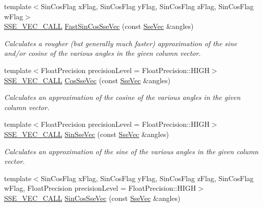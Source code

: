 \begin{DoxyCompactItemize}
{\footnotesize template$<$Sin\+Cos\+Flag x\+Flag, Sin\+Cos\+Flag y\+Flag, Sin\+Cos\+Flag z\+Flag, Sin\+Cos\+Flag w\+Flag$>$ }\\\hyperlink{ssevec__math__defs_8h_a97454f977a5281455cecacce1e8ba670}{S\+S\+E\+\_\+\+V\+E\+C\+\_\+\+C\+A\+L\+L} \hyperlink{group___s_i_m_d_vec_math_gafadb857fe7e6ccbe5f3c635e3c205258}{Fast\+Sin\+Cos\+Sse\+Vec} (const \hyperlink{namespacegofxmath_a634570ddcd2496053ee966227080e02f}{Sse\+Vec} \&angles)
\begin{DoxyCompactList}\small\item\em Calculates a rougher (but generally much faster) approximation of the sine and/or cosine of the various angles in the given column vector. \end{DoxyCompactList}\item 
{\footnotesize template$<$Float\+Precision precision\+Level = Float\+Precision\+::\+H\+I\+G\+H$>$ }\\\hyperlink{ssevec__math__defs_8h_a97454f977a5281455cecacce1e8ba670}{S\+S\+E\+\_\+\+V\+E\+C\+\_\+\+C\+A\+L\+L} \hyperlink{group___s_i_m_d_vec_math_gacc1711e105bd1188ae80b9b8f7df2555}{Cos\+Sse\+Vec} (const \hyperlink{namespacegofxmath_a634570ddcd2496053ee966227080e02f}{Sse\+Vec} \&angles)
\begin{DoxyCompactList}\small\item\em Calculates an approximation of the cosine of the various angles in the given column vector. \end{DoxyCompactList}\item 
{\footnotesize template$<$Float\+Precision precision\+Level = Float\+Precision\+::\+H\+I\+G\+H$>$ }\\\hyperlink{ssevec__math__defs_8h_a97454f977a5281455cecacce1e8ba670}{S\+S\+E\+\_\+\+V\+E\+C\+\_\+\+C\+A\+L\+L} \hyperlink{group___s_i_m_d_vec_math_gad3563d1afb9f13748de00a48a8a7b298}{Sin\+Sse\+Vec} (const \hyperlink{namespacegofxmath_a634570ddcd2496053ee966227080e02f}{Sse\+Vec} \&angles)
\begin{DoxyCompactList}\small\item\em Calculates an approximation of the sine of the various angles in the given column vector. \end{DoxyCompactList}\item 
{\footnotesize template$<$Sin\+Cos\+Flag x\+Flag, Sin\+Cos\+Flag y\+Flag, Sin\+Cos\+Flag z\+Flag, Sin\+Cos\+Flag w\+Flag, Float\+Precision precision\+Level = Float\+Precision\+::\+H\+I\+G\+H$>$ }\\\hyperlink{ssevec__math__defs_8h_a97454f977a5281455cecacce1e8ba670}{S\+S\+E\+\_\+\+V\+E\+C\+\_\+\+C\+A\+L\+L} \hyperlink{group___s_i_m_d_vec_math_gadea0402aa6c42033d4bd68d8218bd966}{Sin\+Cos\+Sse\+Vec} (const \hyperlink{namespacegofxmath_a634570ddcd2496053ee966227080e02f}{Sse\+Vec} \&angles)

\end{DoxyCompactItemize}
